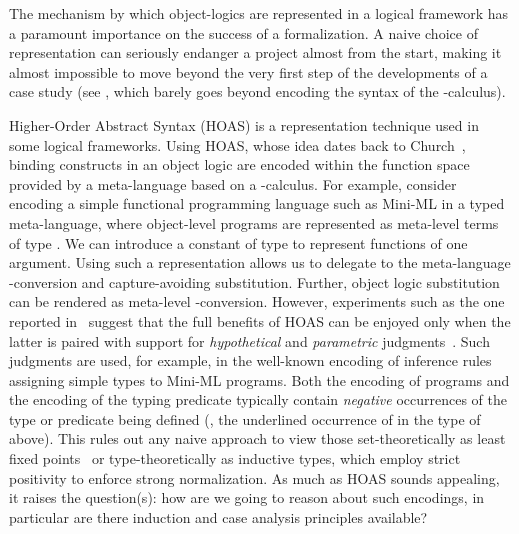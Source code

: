 \documentclass[final]{svjour3}
\begin{document}
The mechanism by which object-logics are represented in a logical
framework has a paramount importance on the success of a
formalization. A naive choice of representation can seriously endanger
a project almost from the start, making it almost impossible to move
beyond the very first step of the developments of a case study (see
\cite{Melham94}, which barely goes beyond encoding the syntax of the
-calculus).

\renewcommand{\gr}{\ensuremath{\mathit expr}}

Higher-Order Abstract Syntax (HOAS) is a representation technique used
in some logical frameworks.  Using HOAS, whose idea dates back to
Church~\cite{Church40}, binding constructs in an object logic are
encoded within the function space provided by a meta-language based on
a -calculus.  For example, consider encoding a simple
functional programming language such as Mini-ML \cite{Clement86} in a
typed meta-language, where object-level programs are represented as
meta-level terms of type .  We can introduce a constant
 of type 
to represent functions of one argument.  Using such a representation
allows us to delegate to the meta-language -conversion and
capture-avoiding substitution.  Further, object logic substitution can
be rendered as meta-level -conversion.  However, experiments
such as the one reported in~\cite{Momigliano02lfm} suggest that the
full benefits of HOAS can be enjoyed only when the latter is paired
with support for \emph{hypothetical} and \emph{parametric}
judgments~\cite{MartinLof85,Harper93jacm,Pfenning99handbook}.  Such
judgments are used, for example, in the well-known encoding of
inference rules assigning simple types to Mini-ML programs.  Both the
encoding of programs and the encoding of the typing predicate
typically contain \emph{negative} occurrences of the type or predicate
being defined (\eg, the underlined occurrence of  in the type of
 above).  
This rules out any naive approach to view those set-theoretically as
least fixed points~\cite{GunterwhyMLnot,Paulson94cade}  or
type-theoretically as inductive types, which employ {strict
  positivity} \cite{PaulinMohring93} to enforce strong
normalization.  As much as HOAS sounds appealing, it raises the
question(s): how are we going to reason about such encodings, in
particular are there induction and case analysis principles available?
\end{document}
